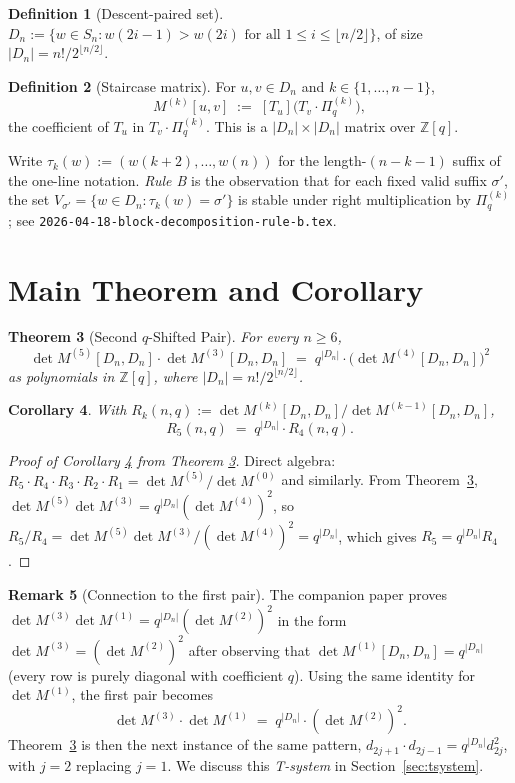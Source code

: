 \documentclass[11pt]{article}
\newtheorem{theorem}{Theorem}
\newtheorem{corollary}[theorem]{Corollary}
\theoremstyle{definition}
\newtheorem{definition}[theorem]{Definition}
\newtheorem{remark}[theorem]{Remark}
\begin{document}
\begin{definition}[Descent-paired set]
$D_n := \{ w \in S_n : w(2i-1) > w(2i) \text{ for all } 1 \le i \le \lfloor n/2\rfloor\}$,
of size $|D_n| = n!/2^{\lfloor n/2 \rfloor}$.
\end{definition}

\begin{definition}[Staircase matrix]
For $u, v \in D_n$ and $k \in \{1, \ldots, n-1\}$,
\[
M^{(k)}[u, v] \;:=\; [T_u]\bigl(T_v \cdot \Pi^{(k)}_q\bigr),
\]
the coefficient of $T_u$ in $T_v \cdot \Pi^{(k)}_q$. This is a
$|D_n| \times |D_n|$ matrix over $\mathbb{Z}[q]$.
\end{definition}

Write $\tau_k(w) := (w(k+2), \ldots, w(n))$ for the length-$(n-k-1)$ suffix of
the one-line notation. \emph{Rule B} is the observation that for each fixed
valid suffix $\sigma'$, the set $V_{\sigma'} = \{w \in D_n : \tau_k(w) = \sigma'\}$
is stable under right multiplication by $\Pi^{(k)}_q$; see
\texttt{2026-04-18-block-decomposition-rule-b.tex}.

\section{Main Theorem and Corollary}

\begin{theorem}[Second $q$-Shifted Pair]
\label{thm:main}
For every $n \geq 6$,
\[
\det M^{(5)}[D_n, D_n] \cdot \det M^{(3)}[D_n, D_n]
\;=\; q^{|D_n|} \cdot \bigl(\det M^{(4)}[D_n, D_n]\bigr)^2
\]
as polynomials in $\mathbb{Z}[q]$, where $|D_n| = n!/2^{\lfloor n/2 \rfloor}$.
\end{theorem}

\begin{corollary}
\label{cor:ratio}
With $R_k(n,q) := \det M^{(k)}[D_n, D_n]/\det M^{(k-1)}[D_n, D_n]$,
\[
R_5(n, q) \;=\; q^{|D_n|} \cdot R_4(n, q).
\]
\end{corollary}

\begin{proof}[Proof of Corollary \ref{cor:ratio} from Theorem \ref{thm:main}]
Direct algebra:
$R_5 \cdot R_4 \cdot R_3 \cdot R_2 \cdot R_1
= \det M^{(5)}/\det M^{(0)}$ and similarly. From Theorem~\ref{thm:main},
$\det M^{(5)} \det M^{(3)} = q^{|D_n|} (\det M^{(4)})^2$, so
$R_5/R_4 = \det M^{(5)} \det M^{(3)}/(\det M^{(4)})^2 = q^{|D_n|}$, which gives
$R_5 = q^{|D_n|} R_4$.
\end{proof}

\begin{remark}[Connection to the first pair]
The companion paper proves $\det M^{(3)}\det M^{(1)} = q^{|D_n|}(\det M^{(2)})^2$
in the form $\det M^{(3)} = (\det M^{(2)})^2$ after observing that
$\det M^{(1)}[D_n, D_n] = q^{|D_n|}$ (every row is purely diagonal with coefficient
$q$). Using the same identity for $\det M^{(1)}$, the first pair becomes
\[
\det M^{(3)} \cdot \det M^{(1)} \;=\; q^{|D_n|} \cdot (\det M^{(2)})^2.
\]
Theorem~\ref{thm:main} is then the next instance of the same pattern,
$d_{2j+1} \cdot d_{2j-1} = q^{|D_n|} d_{2j}^2$, with $j=2$ replacing $j=1$.
We discuss this \emph{T-system} in Section~\ref{sec:tsystem}.
\end{remark}
\end{document}

